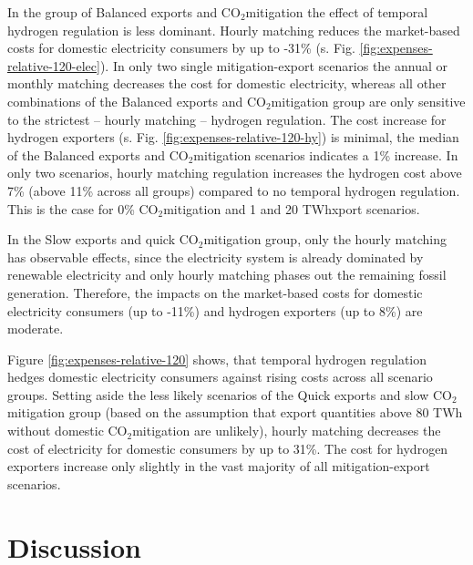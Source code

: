 \documentclass[5p,numafflabel]{elsarticle}
\newcommand{\co}{\ce{CO2}~}
\def\co{CO${}_2${\:}}
\begin{document}
In the group of Balanced exports and \co mitigation the effect of temporal hydrogen regulation is less dominant.
Hourly matching reduces the market-based costs for domestic electricity consumers by up to -31\% (s. Fig. \ref{fig:expenses-relative-120-elec}). In only two single mitigation-export scenarios the annual or monthly matching decreases the cost for domestic electricity, whereas all other combinations of the Balanced exports and \co mitigation group are only sensitive to the strictest -- hourly matching -- hydrogen regulation. 
The cost increase for hydrogen exporters (s. Fig. \ref{fig:expenses-relative-120-hy}) is minimal, the median of the Balanced exports and \co mitigation scenarios indicates a 1\% increase.
In only two scenarios, hourly matching regulation increases the hydrogen cost above 7\% (above 11\% across all groups) compared to no temporal hydrogen regulation. This is the case for 0\% \co mitigation and 1 and 20 TWhxport scenarios. 

In the Slow exports and quick \co mitigation group, only the hourly matching has observable effects, since the electricity system is already dominated by renewable electricity and only hourly matching phases out the remaining fossil generation. Therefore, the impacts on the market-based costs for domestic electricity consumers (up to -11\%) and hydrogen exporters (up to 8\%) are moderate.

Figure \ref{fig:expenses-relative-120} shows, that temporal hydrogen regulation hedges domestic electricity consumers against rising costs across all scenario groups.
Setting aside the less likely scenarios of the Quick exports and slow \co mitigation group (based on the assumption that export quantities above 80 TWh without domestic \co mitigation are unlikely), hourly matching decreases the cost of electricity for domestic consumers by up to 31\%. The cost for hydrogen exporters increase only slightly in the vast majority of all mitigation-export scenarios.


\section*{Discussion}
\label{sec:discussion}
\end{document}
